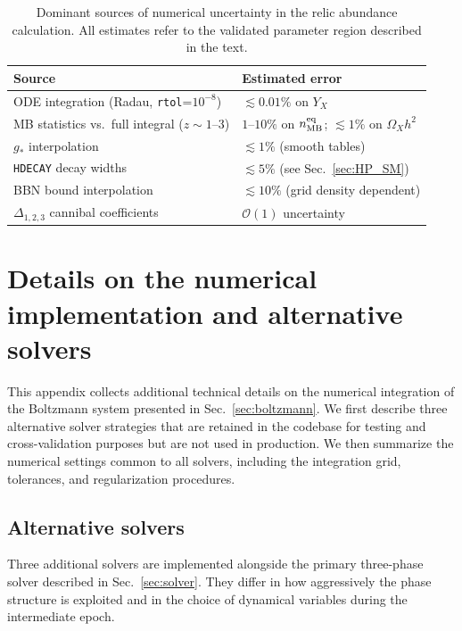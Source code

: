 \documentclass[11pt]{article}
\numberwithin{equation}{section}
\newcommand{\gstar}{g_*}
\newcommand{\neqMB}{n^{\text{eq}}_{\rm MB}}
\begin{document}
\begin{table}
\centering
\begin{tabular}{ll}
\toprule
Source & Estimated error \\
\midrule
ODE integration (Radau, \texttt{rtol}=$10^{-8}$) & $\lesssim 0.01\%$ on $Y_X$ \\
MB statistics vs.\ full integral ($z \sim 1$--$3$) & $1$--$10\%$ on $\neqMB$; $\lesssim 1\%$ on $\Omega_X h^2$ \\
$\gstar$ interpolation & $\lesssim 1\%$ (smooth tables) \\
\texttt{HDECAY} decay widths & $\lesssim 5\%$ (see Sec.~\ref{sec:HP_SM}) \\
BBN bound interpolation & $\lesssim 10\%$ (grid density dependent) \\
$\Delta_{1,2,3}$ cannibal coefficients & $\mathcal{O}(1)$ uncertainty \\
\bottomrule
\end{tabular}
\caption{Dominant sources of numerical uncertainty in the relic abundance calculation. All estimates refer to the validated parameter region described in the text.}
\label{tab:numerics}
\end{table}
 


\section{Details on the numerical implementation and alternative solvers}
\label{app:numerics}

This appendix collects additional technical details on the numerical integration of the Boltzmann system presented in Sec.~\ref{sec:boltzmann}. We first describe three alternative solver strategies that are retained in the codebase for testing and cross-validation purposes but are not used in production. We then summarize the numerical settings common to all solvers, including the integration grid, tolerances, and regularization procedures.

\subsection{Alternative solvers}
\label{app:legacy}

Three additional solvers are implemented alongside the primary three-phase solver described in Sec.~\ref{sec:solver}. They differ in how aggressively the phase structure is exploited and in the choice of dynamical variables during the intermediate epoch.
\end{document}
